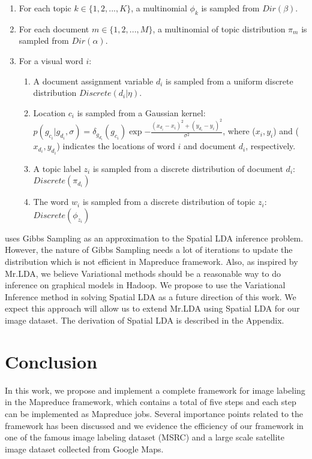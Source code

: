 \documentclass{acm_proc_article-sp}
\begin{document}
\begin{enumerate}
\item For each topic $k \in \{1,2,...,K\}$, a multinomial $\phi_k$ is sampled from $Dir(\beta)$.
\item For each document $m \in \{1,2,...,M\}$, a multinomial of topic distribution $\pi_m$ is sampled from $Dir(\alpha)$.
\item For a visual word $i$:
	\begin{enumerate}
		\item A document assignment variable $d_i$ is sampled from a uniform discrete distribution $Discrete(d_i|\eta)$.
		\item Location $c_i$ is sampled from a Gaussian kernel: $p(g_{c_i} | g_{d_i}, \sigma) = \delta_{g_{d_i}}(g_{c_i}) \exp{-\frac{(x_{d_i} - x_i)^2 + (y_{d_i} - y_i)^2} {\sigma^2}}$, where ($x_i, y_i$) and ($x_{d_i}, y_{d_i}$) indicates the locations of word $i$ and document $d_i$, respectively.
		\item A topic label $z_{i}$ is sampled from a discrete distribution of document $d_i$:  $Discrete(\pi_{d_i})$
		\item The word $w_i$ is sampled from a discrete distribution of topic $z_{i}$: $Discrete(\phi_{z_i})$ 
	\end{enumerate}
\end{enumerate}

\cite{DBLP:conf/nips/WangG07} uses Gibbs Sampling as an approximation to the Spatial LDA inference problem. However, the nature of Gibbs Sampling needs a lot of iterations to update the distribution which is not efficient in Mapreduce framework. Also, as inspired by Mr.LDA, we believe Variational methods should be a reasonable way to do inference on graphical models in Hadoop. We propose to use the Variational Inference method in solving Spatial LDA as a future direction of this work. We expect this approach will allow us to extend Mr.LDA using Spatial LDA for our image dataset. The derivation of Spatial LDA is described in the Appendix.

\section{Conclusion}\label{sec:con}
In this work, we propose and implement a complete framework for image labeling in the Mapreduce framework, which contains a total of five steps and each step can be implemented as Mapreduce jobs. Several importance points related to the framework has been discussed and we evidence the efficiency of our framework in one of the famous image labeling dataset (MSRC) and a large scale satellite image dataset collected from Google Maps.
\end{document}
